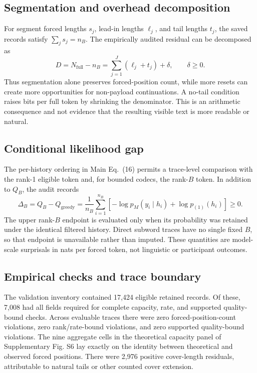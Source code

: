 \documentclass[fleqn,10pt]{wlscirep}
\begin{document}
\subsection*{Segmentation and overhead decomposition}

For segment forced lengths \(s_j\), lead-in lengths \(\ell_j\), and tail lengths \(t_j\), the saved records satisfy \(\sum_js_j=n_B\). The empirically audited residual can be decomposed as
\[
D=N_{\mathrm{full}}-n_B
 =\sum_{j=1}^{J}(\ell_j+t_j)+\delta,\qquad \delta\ge0 .
\]
Thus segmentation alone preserves forced-position count, while more resets can create more opportunities for non-payload continuations. A no-tail condition raises bits per full token by shrinking the denominator. This is an arithmetic consequence and not evidence that the resulting visible text is more readable or natural.



\subsection*{Conditional likelihood gap}

The per-history ordering in Main Eq.~(16) permits a trace-level comparison with the rank-1 eligible token and, for bounded codecs, the rank-\(B\) token. In addition to \(Q_B\), the audit records
\[
\Delta_B
 = Q_B-Q_{\mathrm{greedy}}
 =\frac{1}{n_B}\sum_{i=1}^{n_B}
   \left[-\log p_M(y_i\mid h_i)+\log p_{(1)}(h_i)\right]\ge0 .
\]
The upper rank-\(B\) endpoint is evaluated only when its probability was retained under the identical filtered history. Direct subword traces have no single fixed \(B\), so that endpoint is unavailable rather than imputed. These quantities are model-scale surprisals in nats per forced token, not linguistic or participant outcomes.

\subsection*{Empirical checks and trace boundary}

The validation inventory contained 17,424 eligible retained records. Of these, 7,008 had all fields required for complete capacity, rate, and supported quality-bound checks. Across evaluable traces there were zero forced-position-count violations, zero rank/rate-bound violations, and zero supported quality-bound violations. The nine aggregate cells in the theoretical capacity panel of Supplementary Fig. S6 lay exactly on the identity between theoretical and observed forced positions. There were 2,976 positive cover-length residuals, attributable to natural tails or other counted cover extension.
\end{document}
